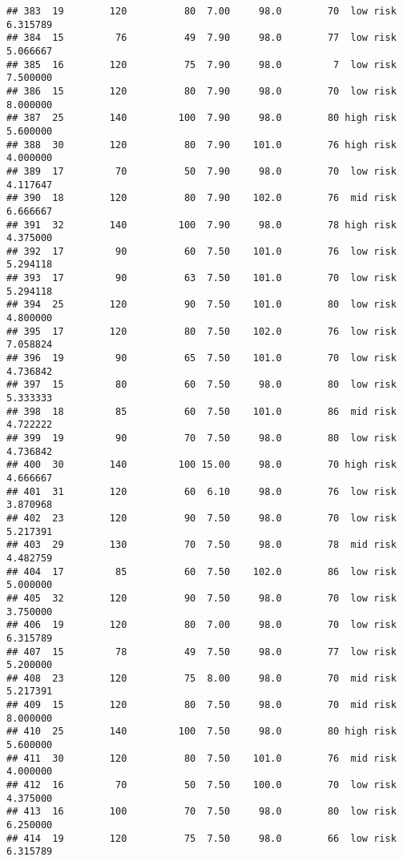 \documentclass[
  ignorenonframetext,
]{beamer}
\begin{document}
\begin{frame}[fragile]
\begin{verbatim}
## 383  19        120          80  7.00     98.0        70  low risk      6.315789
## 384  15         76          49  7.90     98.0        77  low risk      5.066667
## 385  16        120          75  7.90     98.0         7  low risk      7.500000
## 386  15        120          80  7.90     98.0        70  low risk      8.000000
## 387  25        140         100  7.90     98.0        80 high risk      5.600000
## 388  30        120          80  7.90    101.0        76 high risk      4.000000
## 389  17         70          50  7.90     98.0        70  low risk      4.117647
## 390  18        120          80  7.90    102.0        76  mid risk      6.666667
## 391  32        140         100  7.90     98.0        78 high risk      4.375000
## 392  17         90          60  7.50    101.0        76  low risk      5.294118
## 393  17         90          63  7.50    101.0        70  low risk      5.294118
## 394  25        120          90  7.50    101.0        80  low risk      4.800000
## 395  17        120          80  7.50    102.0        76  low risk      7.058824
## 396  19         90          65  7.50    101.0        70  low risk      4.736842
## 397  15         80          60  7.50     98.0        80  low risk      5.333333
## 398  18         85          60  7.50    101.0        86  mid risk      4.722222
## 399  19         90          70  7.50     98.0        80  low risk      4.736842
## 400  30        140         100 15.00     98.0        70 high risk      4.666667
## 401  31        120          60  6.10     98.0        76  low risk      3.870968
## 402  23        120          90  7.50     98.0        70  low risk      5.217391
## 403  29        130          70  7.50     98.0        78  mid risk      4.482759
## 404  17         85          60  7.50    102.0        86  low risk      5.000000
## 405  32        120          90  7.50     98.0        70  low risk      3.750000
## 406  19        120          80  7.00     98.0        70  low risk      6.315789
## 407  15         78          49  7.50     98.0        77  low risk      5.200000
## 408  23        120          75  8.00     98.0        70  mid risk      5.217391
## 409  15        120          80  7.50     98.0        70  mid risk      8.000000
## 410  25        140         100  7.50     98.0        80 high risk      5.600000
## 411  30        120          80  7.50    101.0        76  mid risk      4.000000
## 412  16         70          50  7.50    100.0        70  low risk      4.375000
## 413  16        100          70  7.50     98.0        80  low risk      6.250000
## 414  19        120          75  7.50     98.0        66  low risk      6.315789

\end{verbatim}
\end{frame}
\end{document}
